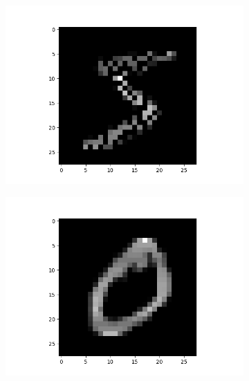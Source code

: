 \documentclass[12pt,a4paper]{article}
\begin{document}
\begin{enumerate}
\begin{enumerate}
\begin{figure}[H]
\begin{subfigure}{0.5\textwidth}
                                    \includegraphics[width=\textwidth]{images/im8.png}
                                \end{subfigure}
                            \end{figure}
                            \begin{figure}[H]
                                \begin{subfigure}{0.5\textwidth}
                                    \raggedleft
                                    \includegraphics[width=\textwidth]{images/im5.png}
                                \end{subfigure}
                                \begin{subfigure}{0.5\textwidth}

\end{subfigure}
\end{figure}
\end{enumerate}
\end{enumerate}
\end{document}
